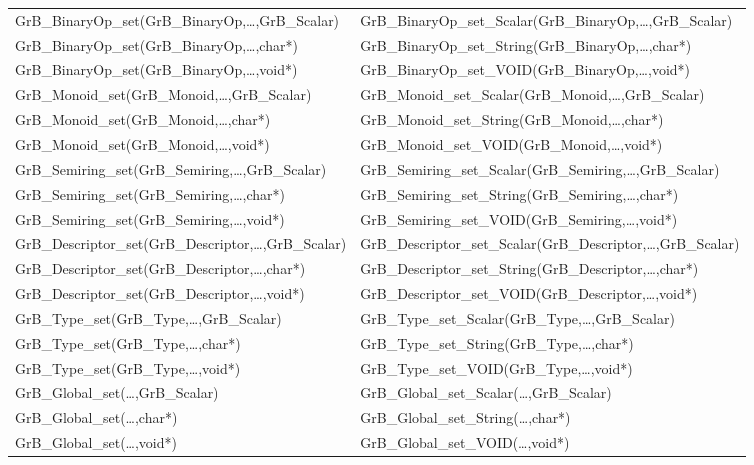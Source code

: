 \begin{table}[htb]
{\begin{tabular}{l|l}
{\sf GrB\_BinaryOp\_set(GrB\_BinaryOp,\ldots,GrB\_Scalar)}  & {\sf GrB\_BinaryOp\_set\_Scalar(GrB\_BinaryOp,\ldots,GrB\_Scalar)} \\
{\sf GrB\_BinaryOp\_set(GrB\_BinaryOp,\ldots,char*)}        & {\sf GrB\_BinaryOp\_set\_String(GrB\_BinaryOp,\ldots,char*)} \\
{\sf GrB\_BinaryOp\_set(GrB\_BinaryOp,\ldots,void*)}        & {\sf GrB\_BinaryOp\_set\_VOID(GrB\_BinaryOp,\ldots,void*)} \\
\hline

{\sf GrB\_Monoid\_set(GrB\_Monoid,\ldots,GrB\_Scalar)}  & {\sf GrB\_Monoid\_set\_Scalar(GrB\_Monoid,\ldots,GrB\_Scalar)} \\
{\sf GrB\_Monoid\_set(GrB\_Monoid,\ldots,char*)}        & {\sf GrB\_Monoid\_set\_String(GrB\_Monoid,\ldots,char*)} \\
{\sf GrB\_Monoid\_set(GrB\_Monoid,\ldots,void*)}        & {\sf GrB\_Monoid\_set\_VOID(GrB\_Monoid,\ldots,void*)} \\
\hline

{\sf GrB\_Semiring\_set(GrB\_Semiring,\ldots,GrB\_Scalar)}  & {\sf GrB\_Semiring\_set\_Scalar(GrB\_Semiring,\ldots,GrB\_Scalar)} \\
{\sf GrB\_Semiring\_set(GrB\_Semiring,\ldots,char*)}        & {\sf GrB\_Semiring\_set\_String(GrB\_Semiring,\ldots,char*)} \\
{\sf GrB\_Semiring\_set(GrB\_Semiring,\ldots,void*)}        & {\sf GrB\_Semiring\_set\_VOID(GrB\_Semiring,\ldots,void*)} \\
\hline

{\sf GrB\_Descriptor\_set(GrB\_Descriptor,\ldots,GrB\_Scalar)}  & {\sf GrB\_Descriptor\_set\_Scalar(GrB\_Descriptor,\ldots,GrB\_Scalar)} \\
{\sf GrB\_Descriptor\_set(GrB\_Descriptor,\ldots,char*)}        & {\sf GrB\_Descriptor\_set\_String(GrB\_Descriptor,\ldots,char*)} \\
{\sf GrB\_Descriptor\_set(GrB\_Descriptor,\ldots,void*)}        & {\sf GrB\_Descriptor\_set\_VOID(GrB\_Descriptor,\ldots,void*)} \\
\hline

{\sf GrB\_Type\_set(GrB\_Type,\ldots,GrB\_Scalar)}  & {\sf GrB\_Type\_set\_Scalar(GrB\_Type,\ldots,GrB\_Scalar)} \\
{\sf GrB\_Type\_set(GrB\_Type,\ldots,char*)}        & {\sf GrB\_Type\_set\_String(GrB\_Type,\ldots,char*)} \\
{\sf GrB\_Type\_set(GrB\_Type,\ldots,void*)}        & {\sf GrB\_Type\_set\_VOID(GrB\_Type,\ldots,void*)} \\
\hline

{\sf GrB\_Global\_set(\ldots,GrB\_Scalar)}  & {\sf GrB\_Global\_set\_Scalar(\ldots,GrB\_Scalar)} \\
{\sf GrB\_Global\_set(\ldots,char*)}        & {\sf GrB\_Global\_set\_String(\ldots,char*)} \\
{\sf GrB\_Global\_set(\ldots,void*)}        & {\sf GrB\_Global\_set\_VOID(\ldots,void*)} \\
\hline
\end{tabular}
}
\label{Tab:NonPolymorphic7b}
\end{table}